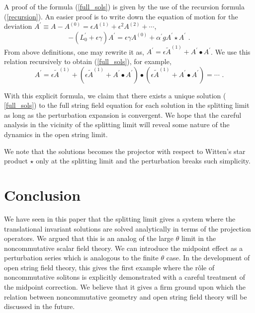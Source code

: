 \documentclass[a4paper,aps,preprint,nofootinbib,eqsecnum]{revtex4}
\begin{document}
A proof of the formula (\ref{full_sols}) is given by the use of the
recursion formula (\ref{recursion}). An easier proof is to write down the
equation of motion for the deviation $A^{\prime }\equiv A-A^{\left( 0\right)
}=\epsilon A^{\left( 1\right) }+\epsilon ^{2}A^{\left( 2\right) }+\cdots $,
\begin{equation}
-(L_{0}^{\prime }+\epsilon \gamma )A^{\prime }=\epsilon \gamma A^{\left(
0\right) }+{\alpha ^{\prime }}gA^{\prime }\star A^{\prime }\,\,.
\end{equation}%
{}From above definitions, one may rewrite it as, $A^{\prime }=\epsilon
\tilde{A}^{\left( 1\right) }+A^{\prime }\bullet A^{\prime }$. We use this
relation recursively to obtain (\ref{full_sols}), for example,
\begin{equation}
A^{\prime }=\epsilon \tilde{A}^{\left( 1\right) }+(\epsilon \tilde{A}%
^{\left( 1\right) }+A^{\prime }\bullet A^{\prime })\bullet (\epsilon \tilde{A%
}^{\left( 1\right) }+A^{\prime }\bullet A^{\prime })=\cdots \,\,.
\end{equation}

With this explicit formula, we claim that there exists a unique solution (%
\ref{full_sols}) to the full string field equation for each solution in the
splitting limit as long as the perturbation expansion is convergent. We hope
that the careful analysis in the vicinity of the splitting limit will reveal
some nature of the dynamics in the open string limit.

We note that the solutions becomes the projector with respect to Witten's
star product $\star$ only at the splitting limit and the perturbation breaks
such simplicity.

\section{Conclusion}

We have seen in this paper that the splitting limit gives a system
where the translational invariant solutions are solved
analytically in terms of the projection operators. We argued that
this is an analog of the large $\theta $ limit in the
noncommutative scalar field theory. We can introduce the midpoint
effect as a perturbation series which is analogous to the finite
$\theta $ case.
In the development of open string field theory, this gives the
first example where the r\^{o}le of noncommutative solitons is
explicitly demonstrated with a careful treatment of the midpoint
correction. We believe that it gives a firm ground upon which the
relation between noncommutative geometry and open string field
theory will be discussed in the future.
\end{document}
